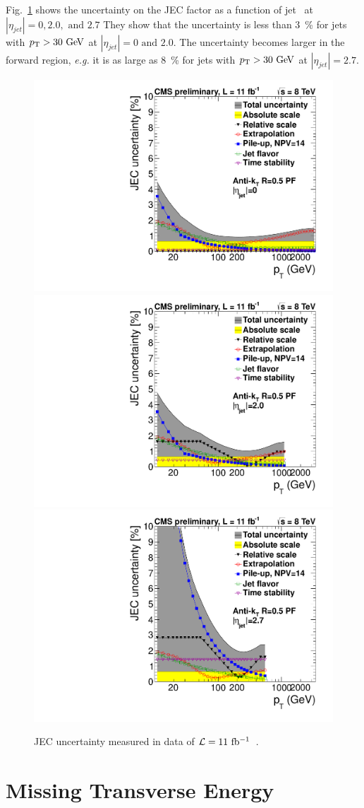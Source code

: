 Fig.~\ref{fig:jecuncert} shows the uncertainty on the JEC factor
as a function of jet \pt\ at $|\eta_{jet}|=0, 2.0, \textrm{ and }2.7$ 
They show that the uncertainty is less than 3~\% for jets with 
$p_\mathrm{T}>30~\mathrm{Ge\kern -0.1em V}$ at $|\eta_{jet}|=0 \textrm{ and } 2.0$. 
The uncertainty becomes larger in the forward region, 
\textit{e.g.} it is as large as 8~\% for jets with $p_\mathrm{T}>30~\mathrm{Ge\kern -0.1em V}$ at $|\eta_{jet}|=2.7$.  


\begin{figure}[!hbtp]
\centering
\includegraphics[width=.45\textwidth]{figures/JECUncert_Fall12_DATA_AK5PF_Eta00.pdf}
\includegraphics[width=.45\textwidth]{figures/JECUncert_Fall12_DATA_AK5PF_Eta20.pdf} \\
\includegraphics[width=.45\textwidth]{figures/JECUncert_Fall12_DATA_AK5PF_Eta27.pdf} 
\caption{JEC uncertainty measured in data of $\mathcal{L}=11~\mathrm{fb^{-1}}$~\cite{DPS-2013-011}.}
\label{fig:jecuncert}
\end{figure}



\section{ Missing Transverse Energy }

